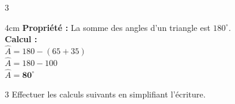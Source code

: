 \documentclass[a4paper]{book}
\begin{document}
{\begin{exerciceNote}{3}
\begin{minipage}{0.32\linewidth}
\begin{center}
            \end{center}

            \begin{ZoneReponse}{4cm}
                 \textbf{Propriété :} La somme des angles d'un triangle est $180^\circ$. \\
                 \textbf{Calcul :} \\
                 $\widehat{A} = 180 - (65 + 35)$ \\
                 $\widehat{A} = 180 - 100$ \\
                 $\widehat{A} = \mathbf{80^\circ}$
            \end{ZoneReponse}
        \end{minipage}
    \end{exerciceNote}
       

    \begin{exerciceNote}{3}  
        Effectuer les calculs suivants en simplifiant l'écriture.

        \medskip
        

\end{exerciceNote}}
\end{document}
